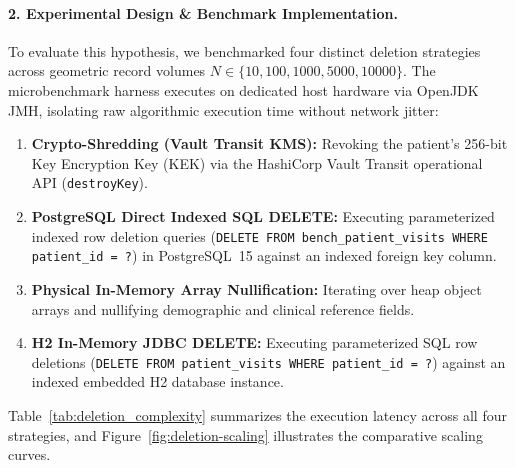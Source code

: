 \paragraph{2. Experimental Design \& Benchmark Implementation.}
To evaluate this hypothesis, we benchmarked four distinct deletion strategies across geometric record volumes $N \in \{10, 100, 1000, 5000, 10000\}$. The microbenchmark harness executes on dedicated host hardware via OpenJDK JMH, isolating raw algorithmic execution time without network jitter:
\begin{enumerate}
    \item \textbf{Crypto-Shredding (Vault Transit KMS):} Revoking the patient's 256-bit Key Encryption Key (KEK) via the HashiCorp Vault Transit operational API (\texttt{destroyKey}).
    \item \textbf{PostgreSQL Direct Indexed SQL DELETE:} Executing parameterized indexed row deletion queries (\texttt{DELETE FROM bench\_patient\_visits WHERE patient\_id = ?}) in PostgreSQL~15 against an indexed foreign key column.
    \item \textbf{Physical In-Memory Array Nullification:} Iterating over heap object arrays and nullifying demographic and clinical reference fields.
    \item \textbf{H2 In-Memory JDBC DELETE:} Executing parameterized SQL row deletions (\texttt{DELETE FROM patient\_visits WHERE patient\_id = ?}) against an indexed embedded H2 database instance.
\end{enumerate}

Table~\ref{tab:deletion_complexity} summarizes the execution latency across all four strategies, and Figure~\ref{fig:deletion-scaling} illustrates the comparative scaling curves.

